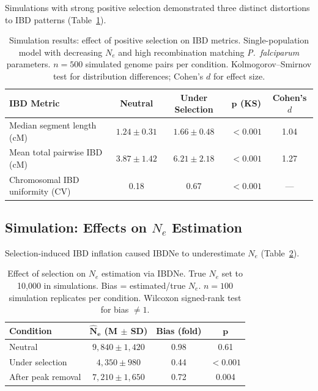 \documentclass[11pt]{article}
\begin{document}
Simulations with strong positive selection demonstrated three distinct distortions to IBD patterns (Table~\ref{tab:sim_ibd}).

\begin{table}[H]
\centering
\caption{Simulation results: effect of positive selection on IBD metrics. Single-population model with decreasing $N_e$ and high recombination matching \textit{P.~falciparum} parameters. $n = 500$ simulated genome pairs per condition. Kolmogorov--Smirnov test for distribution differences; Cohen's $d$ for effect size.}
\label{tab:sim_ibd}
\begin{tabular}{lcccc}
\toprule
\textbf{IBD Metric} & \textbf{Neutral} & \textbf{Under Selection} & $\boldsymbol{p}$ (KS) & \textbf{Cohen's $d$} \\
\midrule
Median segment length (cM) & $1.24 \pm 0.31$ & $1.66 \pm 0.48$ & $< 0.001$ & 1.04 \\
Mean total pairwise IBD (cM) & $3.87 \pm 1.42$ & $6.21 \pm 2.18$ & $< 0.001$ & 1.27 \\
Chromosomal IBD uniformity (CV) & 0.18 & 0.67 & $< 0.001$ & --- \\
\bottomrule
\end{tabular}
\end{table}

\subsection{Simulation: Effects on $N_e$ Estimation}

Selection-induced IBD inflation caused IBDNe to underestimate $N_e$ (Table~\ref{tab:sim_ne}).

\begin{table}[H]
\centering
\caption{Effect of selection on $N_e$ estimation via IBDNe. True $N_e$ set to 10,000 in simulations. Bias = estimated/true $N_e$. $n = 100$ simulation replicates per condition. Wilcoxon signed-rank test for bias $\neq 1$.}
\label{tab:sim_ne}
\begin{tabular}{lccc}
\toprule
\textbf{Condition} & $\boldsymbol{\hat{N}_e}$ \textbf{(M $\pm$ SD)} & \textbf{Bias (fold)} & $\boldsymbol{p}$ \\
\midrule
Neutral & $9,840 \pm 1,420$ & 0.98 & 0.61 \\
Under selection & $4,350 \pm 980$ & 0.44 & $< 0.001$ \\
After peak removal & $7,210 \pm 1,650$ & 0.72 & 0.004 \\
\bottomrule
\end{tabular}
\end{table}
\end{document}
